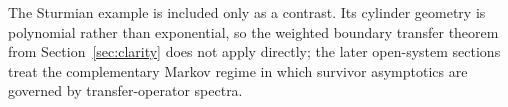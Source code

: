 The Sturmian example is included only as a contrast.  Its cylinder
geometry is polynomial rather than exponential, so the weighted boundary
transfer theorem from Section~\ref{sec:clarity} does not apply directly;
the later open-system sections treat the complementary Markov regime in
which survivor asymptotics are governed by transfer-operator spectra.
